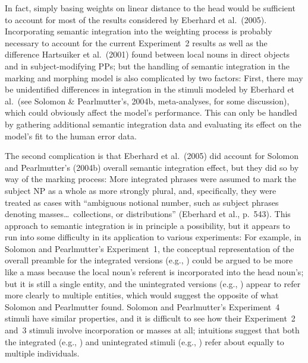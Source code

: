 \documentclass[12pt,titlepage]{article}
\begin{document}
In fact, simply basing weights on linear distance to the head would be
sufficient to account for most of the results considered by Eberhard et
al.\ (2005).  Incorporating semantic integration into the weighting process
is probably necessary to account for the current Experiment~2 results as
well as the difference Hartsuiker et al.\ (2001) found between local nouns
in direct objects and in subject-modifying PPs; but the handling of
semantic integration in the marking and morphing model is also complicated
by two factors: First, there may be unidentified differences in integration
in the stimuli modeled by Eberhard et al.\ (see Solomon \& Pearlmutter's,
2004b, meta-analyses, for some discussion), which could obviously affect
the model's performance.  This can only be handled by gathering additional
semantic integration data and evaluating its effect on the model's fit to
the human error data.

The second complication is that Eberhard et al.\ (2005) did account for
Solomon and Pearlmutter's (2004b) overall semantic integration effect, but
they did so by way of the marking process: More integrated phrases were
assumed to mark the subject NP as a whole as more strongly plural, and,
specifically, they were treated as cases with ``ambiguous notional number,
such as subject phrases denoting masses\ldots\ collections, or distributions''
(Eberhard et al., p.~543).  This approach to semantic integration is in
principle a possibility, but it appears to run into some difficulty in its
application to various experiments: For example, in Solomon and
Pearlmutter's Experiment~1, the conceptual representation of the overall
preamble for the integrated versions (e.g., ) could be argued to be more like a mass because the local noun's
referent is incorporated into the head noun's; but it is still a single
entity, and the unintegrated versions (e.g., ) appear to refer more clearly to multiple entities, which would
suggest the opposite of what Solomon and Pearlmutter found.  Solomon and
Pearlmutter's Experiment~4 stimuli have similar properties, and it is
difficult to see how their Experiment~2 and~3 stimuli involve incorporation
or masses at all; intuitions suggest that both the integrated (e.g.,
) and unintegrated stimuli (e.g.,
) refer about equally to multiple
individuals.
\end{document}
